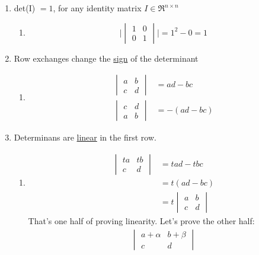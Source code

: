 \documentclass[twocolumn,draft]{article}
\begin{document}
  \begin{enumerate}
  	\item det(I) $=1$, for any identity matrix $I\in\Re^{n\times n}$
		\begin{enumerate}
			\item 
				\begin{equation*}
					\Big|\begin{vmatrix}
						1 & 0 \\
						0 & 1
					\end{vmatrix}\Big|
					= 1^{2} - 0 = 1
				\end{equation*}
		\end{enumerate}
	\item Row exchanges change the \underline{sign} of the determinant
		\begin{enumerate}
			\item
				\begin{align*}
					\begin{vmatrix}
						a & b \\ c & d
					\end{vmatrix} &= ad - bc \\
  					\begin{vmatrix}
  						c & d \\ a & b
  					\end{vmatrix} &= -(ad - bc)
				\end{align*}
		\end{enumerate}
	\item Determinans are \underline{linear} in the first row.
		\begin{enumerate}
			\item 
				\begin{align*}
					\begin{vmatrix}
						ta & tb \\ c & d
					\end{vmatrix}
					&= tad - tbc \\
					&= t(ad-bc) \\
					&= t
  					\begin{vmatrix}
  						a & b \\ c & d
  					\end{vmatrix} \tag*{(scalar multiplication)}
				\end{align*}
				That's one half of proving linearity. Let's prove the other half:
				\begin{align*}
					\begin{vmatrix}
						a + \alpha & b + \beta \\ c & d

\end{vmatrix}
\end{align*}
\end{enumerate}
\end{enumerate}
\end{document}
